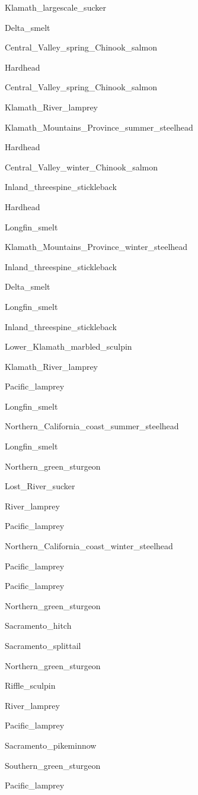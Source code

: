 \documentclass[]{article}
\begin{document}
Klamath\_largescale\_sucker

Delta\_smelt

Central\_Valley\_spring\_Chinook\_salmon

Hardhead

Central\_Valley\_spring\_Chinook\_salmon

Klamath\_River\_lamprey

Klamath\_Mountains\_Province\_summer\_steelhead

Hardhead

Central\_Valley\_winter\_Chinook\_salmon

Inland\_threespine\_stickleback

Hardhead

Longfin\_smelt

Klamath\_Mountains\_Province\_winter\_steelhead

Inland\_threespine\_stickleback

Delta\_smelt

Longfin\_smelt

Inland\_threespine\_stickleback

Lower\_Klamath\_marbled\_sculpin

Klamath\_River\_lamprey

Pacific\_lamprey

Longfin\_smelt

Northern\_California\_coast\_summer\_steelhead

Longfin\_smelt

Northern\_green\_sturgeon

Lost\_River\_sucker

River\_lamprey

Pacific\_lamprey

Northern\_California\_coast\_winter\_steelhead

Pacific\_lamprey

Pacific\_lamprey

Northern\_green\_sturgeon

Sacramento\_hitch

Sacramento\_splittail

Northern\_green\_sturgeon

Riffle\_sculpin

River\_lamprey

Pacific\_lamprey

Sacramento\_pikeminnow

Southern\_green\_sturgeon

Pacific\_lamprey
\end{document}
